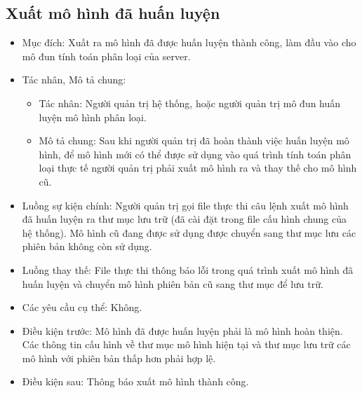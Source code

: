 \subsection{Xuất mô hình đã huấn luyện}
\begin{itemize}
	\item Mục đích: Xuất ra mô hình đã được huấn luyện thành công, làm đầu vào cho	mô đun tính toán phân loại của server.
	\item Tác nhân, Mô tả chung:
	\begin{itemize}
		\item Tác nhân: Người quản trị hệ thống, hoặc người quản trị mô đun huấn luyện mô hình phân loại.
		\item Mô tả chung: Sau khi người quản trị đã hoàn thành việc huấn luyện	mô hình, để mô hình mới có thể được sử dụng vào quá trình tính toán	phân loại thực tế người quản trị phải xuất mô hình ra và thay thế cho	mô hình cũ.
	\end{itemize}
	\item Luồng sự kiện chính: Người quản trị gọi file thực thi câu lệnh xuất mô hình đã huấn luyện ra thư mục lưu trữ (đã cài đặt trong file cấu hình chung của hệ thống). Mô hình cũ đang được sử dụng được chuyển sang thư mục lưu các phiên bản không còn sử dụng.
	\item Luồng thay thế: File thực thi thông báo lỗi trong quá trình xuất mô hình đã huấn luyện và chuyển mô hình phiên bản cũ sang thư mục để lưu trữ.
	\item Các yêu cầu cụ thể: Không.
	\item Điều kiện trước: Mô hình đã được huấn luyện phải là mô hình hoàn thiện. Các thông tin cấu hình về thư mục mô hình hiện tại và thư mục lưu trữ các mô hình với phiên bản thấp hơn phải hợp lệ.
	\item Điều kiện sau: Thông báo xuất mô hình thành công.
\end{itemize}

